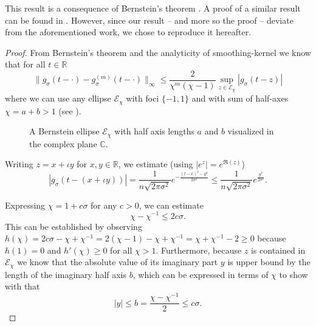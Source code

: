 This result is a consequence of Bernstein's theorem \cite[theorem~4.3]{trefethen2008gauss}.
A proof of a similar result can be found in \cite[theorem~2]{lin2017randomized}.
However, since our result -- and more so the proof -- deviate from the aforementioned
work, we chose to reproduce it hereafter.
\begin{proof}
    From Bernstein's theorem \cite[theorem~4.3]{trefethen2008gauss}
    and the analyticity of \gls{smoothing-kernel} we know that for all $t \in \mathbb{R}$
    \begin{equation}
        \lVert g_{\sigma}(t - \cdot) - g_{\sigma}^{(m)}(t - \cdot) \rVert _{\infty}
        \leq \frac{2}{\chi^{m}(\chi - 1)} \sup_{z \in \mathcal{E}_{\chi}} |g_{\sigma}(t - z)|
        \label{equ:2-chebyshev-convergence-proof-base}
    \end{equation}
    where we can use any ellipse $\mathcal{E}_{\chi}$
    with foci $\{-1, 1\}$ and with sum of half-axes $\chi = a + b > 1$
    (see ).

    \begin{figure}[ht]
        \centering
        
        \caption{A Bernstein ellipse $\mathcal{E}_{\chi}$ with half axis lengths $a$ and
            $b$ visualized in the complex plane $\mathbb{C}$.}
        \label{fig:2-chebyshev-proof-bernstein-ellipse}
    \end{figure}

    Writing $z = x + \iota y$ for $x,y \in \mathbb{R}$, we estimate (using $|e^z| = e^{\Re(z)}$)
    \begin{equation}
        |g_{\sigma}(t - (x + \iota y))|
        = \frac{1}{n \sqrt{2 \pi \sigma^2}} e^{- \frac{(t - x)^2 - y^2}{2 \sigma^2}}
        \leq \frac{1}{n \sqrt{2 \pi \sigma^2}} e^{\frac{y^2}{2 \sigma^2}}.
    \end{equation}

    Expressing $\chi = 1 + c \sigma$ for any $c > 0$,
    we can estimate
    \begin{equation}
        \chi - \chi^{-1} \leq 2c\sigma.
        \label{equ:2-chebyshev-bernstein-proof-estimate}
    \end{equation}
    This can be established by observing
    $h(\chi) = 2c\sigma - \chi + \chi^{-1} = 2(\chi - 1) - \chi + \chi^{-1} = \chi + \chi^{-1} - 2 \geq 0$
    because $h(1) = 0$ and $h'(\chi) \geq 0$ for all $\chi > 1$.
    Furthermore, because $z$ is
    contained in $\mathcal{E}_{\chi}$ we know that the absolute value of its
    imaginary part $y$ is upper bound by the length of the imaginary half axis $b$,
    which can be expressed in terms of $\chi$ to show with 
    that
    \begin{equation}
        |y| \leq b = \frac{\chi - \chi^{-1}}{2} \leq c\sigma.
    \end{equation}


\end{proof}

